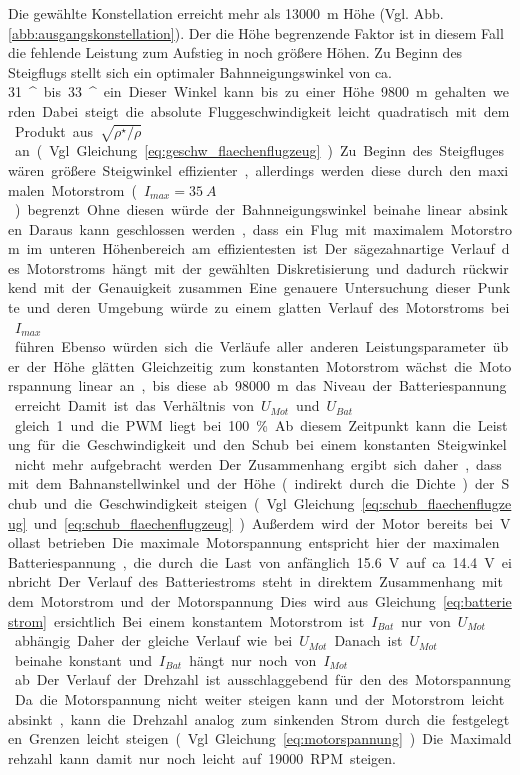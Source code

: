 Die gewählte Konstellation erreicht mehr als \SI{13000}{m} Höhe (Vgl. Abb. \ref{abb:ausgangskonstellation}). Der die Höhe begrenzende Faktor ist in diesem Fall die fehlende Leistung zum Aufstieg in noch größere Höhen. Zu Beginn des Steigflugs stellt sich ein optimaler Bahnneigungswinkel von ca. \SI{31}{^\circ} bis \SI{33}{^\star} ein. Dieser Winkel kann bis zu einer Höhe \SI{9800}{m} gehalten werden. Dabei steigt die absolute Fluggeschwindigkeit leicht quadratisch mit dem Produkt aus \ensuremath{\sqrt{\rho^\star/\rho}} an (Vgl. Gleichung \ref{eq:geschw_flaechenflugzeug}). Zu Beginn des Steigfluges wären größere Steigwinkel effizienter, allerdings werden diese durch den maximalen Motorstrom (\ensuremath{I_{max} = \SI{35}{A}}) begrenzt. Ohne diesen würde der Bahnneigungswinkel beinahe linear absinken. Daraus kann geschlossen werden, dass ein Flug mit maximalem Motorstrom im unteren Höhenbereich am effizientesten ist. Der sägezahnartige Verlauf des Motorstroms hängt mit der gewählten Diskretisierung und dadurch rückwirkend mit der Genauigkeit zusammen. Eine genauere Untersuchung dieser Punkte und deren Umgebung würde zu einem glatten Verlauf des Motorstroms bei \ensuremath{I_{max}} führen. Ebenso würden sich die Verläufe aller anderen Leistungsparameter über der Höhe glätten. Gleichzeitig zum konstanten Motorstrom wächst die Motorspannung linear an, bis diese ab \SI{98000}{m} das Niveau der Batteriespannung erreicht. Damit ist das Verhältnis von \ensuremath{U_{Mot}} und \ensuremath{U_{Bat}} gleich 1 und  die PWM liegt bei \SI{100}{\%}. Ab diesem Zeitpunkt kann die Leistung für die Geschwindigkeit und den Schub bei einem konstanten Steigwinkel nicht mehr aufgebracht werden. Der Zusammenhang ergibt sich daher, dass mit dem Bahnanstellwinkel und der Höhe (indirekt durch die Dichte) der Schub und die Geschwindigkeit steigen (Vgl. Gleichung \ref{eq:schub_flaechenflugzeug} und \ref{eq:schub_flaechenflugzeug}). Außerdem wird der Motor bereits bei Vollast betrieben. Die maximale Motorspannung entspricht hier der maximalen Batteriespannung, die durch die Last von anfänglich \SI{15,6}{V} auf ca. \SI{14.4}{V} einbricht. Der Verlauf des Batteriestroms steht in direktem Zusammenhang mit dem Motorstrom und der Motorspannung. Dies wird aus Gleichung \ref{eq:batteriestrom} ersichtlich. Bei einem konstantem Motorstrom ist  \ensuremath{I_{Bat}} nur von \ensuremath{U_{Mot}} abhängig. Daher der gleiche Verlauf wie bei \ensuremath{U_{Mot}}. Danach ist \ensuremath{U_{Mot}} beinahe konstant und \ensuremath{I_{Bat}} hängt nur noch von \ensuremath{I_{Mot}} ab. Der Verlauf der Drehzahl ist ausschlaggebend für den des Motorspannung. Da die Motorspannung nicht weiter steigen kann und der Motorstrom leicht absinkt, kann die Drehzahl analog zum sinkenden Strom durch die festgelegten Grenzen leicht steigen (Vgl. Gleichung \ref{eq:motorspannung}). Die Maximaldrehzahl kann damit nur noch leicht auf \SI{19000}{RPM} steigen. 
